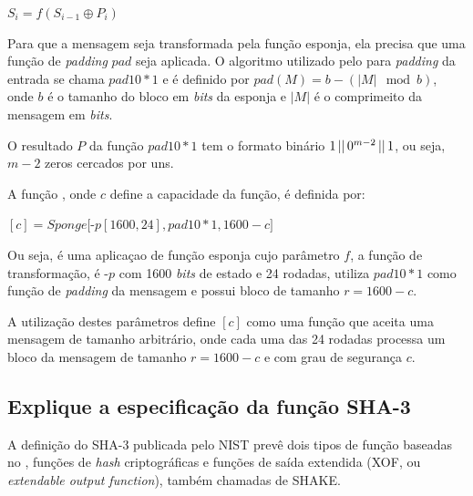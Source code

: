 \begin{center}
        $S_{i} = f(S_{i-1} \oplus P_{i})$
\end{center}

Para que a mensagem seja transformada pela função esponja, ela precisa que uma
função de \textit{padding} $pad$ seja aplicada. O algoritmo utilizado pelo
\Keccak{} para \textit{padding} da entrada se chama $pad10*1$ e é definido por
$pad(M) = b - (|M| \mod b)$, onde $b$ é o tamanho do bloco em \textit{bits}
da esponja e $|M|$ é o comprimeito da mensagem em \textit{bits}.

O resultado $P$ da função $pad10*1$ tem o formato binário
$1 \operatorname{\lvert\rvert} 0^{m-2} \operatorname{\lvert\rvert} 1$, ou seja, $m-2$ zeros cercados por uns.

A função \Keccak[c], onde $c$ define a capacidade da função, é definida por:

\begin{center}
    \Keccak$[c] = Sponge[$\Keccak-$p[1600, 24], pad10*1, 1600-c]$
\end{center}

Ou seja, é uma aplicaçao de função esponja cujo parâmetro $f$, a função de
transformação, é \Keccak-$p$ com 1600 \textit{bits} de estado e 24 rodadas,
utiliza $pad10*1$ como função de \textit{padding} da mensagem e possui bloco
de tamanho $r = 1600 - c$.

A utilização destes parâmetros define \Keccak$[c]$ como uma função que aceita
uma mensagem de tamanho arbitrário, onde cada uma das 24 rodadas processa um
bloco da mensagem de tamanho $r = 1600-c$ e com grau de segurança $c$.

\subsection{Explique a especificação da função SHA-3}

A definição do SHA-3 publicada pelo NIST prevê dois tipos de função baseadas no
\Keccak, funções de \textit{hash} criptográficas e funções de saída extendida
(XOF, ou \textit{extendable output function}), também chamadas de SHAKE.

